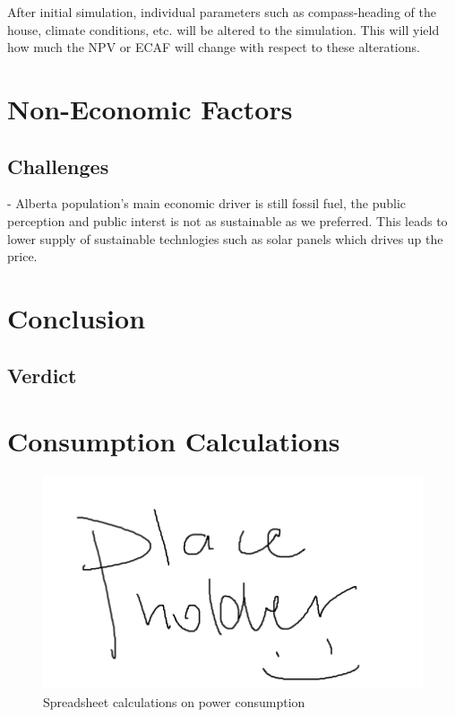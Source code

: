 \documentclass[10pt,letterpaper]{article}
\begin{document}
After initial simulation, individual parameters such as compass-heading of the house, climate conditions, etc. will be altered to the simulation. This will yield how much the NPV or ECAF will change with respect to these alterations.\\

\section{Non-Economic Factors}
\subsection{Challenges}
- Alberta population's main economic driver is still fossil fuel, the public perception and public interst is not as sustainable as we preferred. This leads to lower supply of sustainable technlogies such as solar panels which drives up the price.\\

\section{Conclusion}\label{section:conclusion}

\subsection{Verdict}

\clearpage
{}



\clearpage
\appendix
\section{Consumption Calculations}\label{appendix:consumption}
\begin{figure}[H]
	\centering
	\includegraphics[width=1\textwidth]{assets/placeholder}
	\caption{Spreadsheet calculations on power consumption}
\end{figure}
\end{document}
